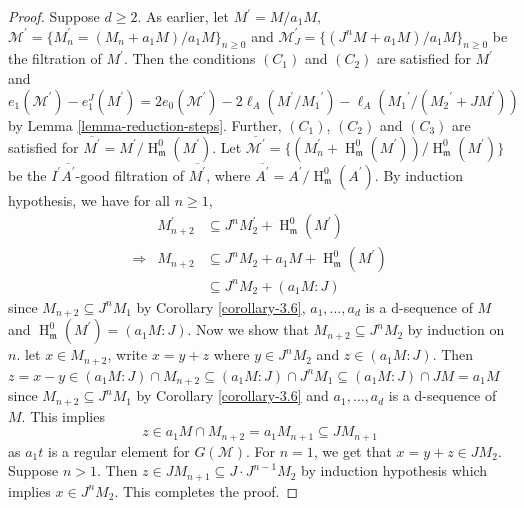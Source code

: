 \documentclass[10pt,a4paper]{amsart}
\def\M{{\mathcal M}}
\DeclareMathOperator{\h}{H}
\newcommand{\m}{\mathfrak m}
\begin{document}
\begin{proof}
	Suppose $d\geq 2.$ As earlier, let $M^\prime=M/a_1M,$ 
	$\M^\prime=\{M_n^\prime=(M_n+a_1M)/a_1M\}_{n\geq0}$ and $\M_J^\prime=\{(J^nM+a_1M)/a_1M\}_{n\geq 0}$ be the filtration of $M^\prime$. Then the conditions  $(C_1)$ and $(C_2)$ are satisfied for $M^\prime$ and
	$e_1(\M^\prime)-e_1^J(M^\prime)=2e_0(\M^\prime)-2\ell_A(M^\prime/{M_1}^\prime)-\ell_A({M_1}^\prime/({M_2}^\prime+JM^\prime))$ by Lemma \ref{lemma-reduction-steps}.
	Further, $(C_1)$, $(C_2)$ and $(C_3)$ are satisfied for $\overline{M^\prime}=M^\prime/\h_{\m}^0(M^\prime)$. 
	Let $\overline{\M^\prime} =\{(M_n^\prime+\h_{\m}^0(M^\prime))/\h_{\m}^0(M^\prime)\}$ be the $I^\prime \overline{A^\prime}$-good filtration of $\overline{M^\prime}$, where $\overline{A^\prime}=A^\prime/\h_{\m}^0(A^\prime)$. 
	By induction hypothesis, we have for all $n\geq 1$,
	\begin{eqnarray*}
		&M_{n+2}^\prime&\subseteq  J^n M_2 ^\prime+\h_{\m}^0(M^\prime)\\
		\Rightarrow & M_{n+2} & \subseteq J^n M_2+a_1M+\h_{\m}^0(M^\prime)\\
		&& \subseteq J^n M_2+(a_1M:J)
	\end{eqnarray*}
	since $M_{n+2}\subseteq J^nM_1$ by Corollary \ref{corollary-3.6}, $a_1,\ldots,a_d$ is a d-sequence of $M$ and $\h_{\m}^0(M^\prime)=(a_1M:J)$. Now we show that $M_{n+2}\subseteq J^nM_2$ by induction on $n$. let $x\in M_{n+2}$, write $x=y+z$ where $y\in J^nM_2$ and 
	$z\in (a_1M:J)$. Then $z=x-y\in (a_1M:J)\cap M_{n+2}\subseteq (a_1M:J)\cap J^n M_1\subseteq (a_1M:J)\cap JM =a_1M$ since
	$M_{n+2}\subseteq J^nM_1$ by Corollary \ref{corollary-3.6} and $a_1,\ldots,a_d$ is a d-sequence of $M$.  This implies $$z\in a_1M\cap M_{n+2}=a_1M_{n+1}\subseteq JM_{n+1}$$ as $a_1t$ is a regular element for $G(\mathcal{M})$. 
	For $n=1$, we get that $x=y+z\in JM_2$. Suppose $n>1$. Then $z\in JM_{n+1}\subseteq J\cdot J^{n-1}M_2$ by induction hypothesis which implies $x\in J^nM_2$. This completes the proof.
\end{proof}
\end{document}
